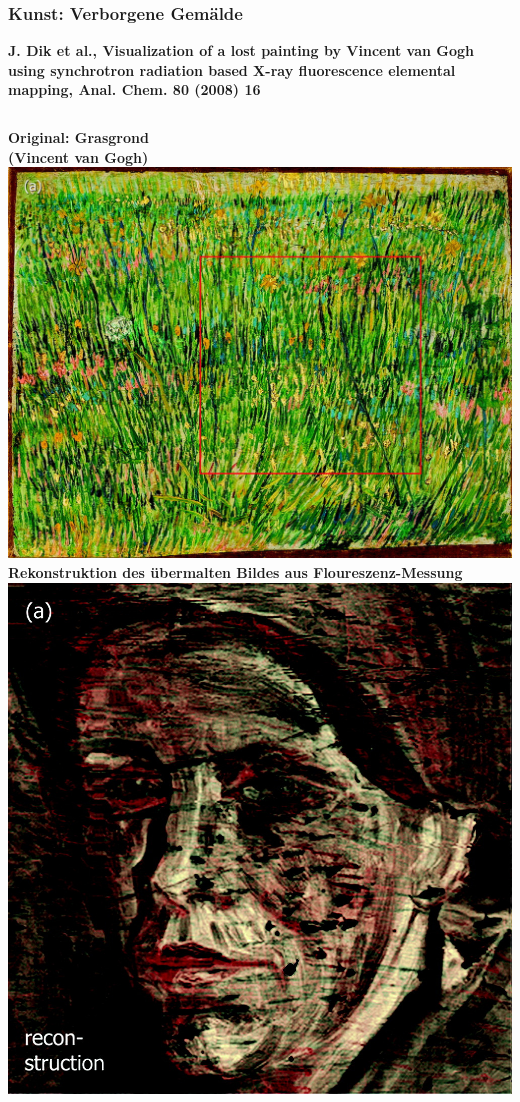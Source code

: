 \documentclass[10pt,t]{beamer}
\begin{document}
\begin{frame}
\frametitle{Kunst: Verborgene Gemälde}
\vspace*{-2.6\baselineskip}
\alert{\bfseries\footnotesize J. Dik et al., Visualization of a lost painting by Vincent van Gogh using synchrotron radiation based X-ray fluorescence elemental mapping, Anal. Chem. 80 (2008) 16 \cite{Dik2008}}
\vspace*{0.5\baselineskip}
\begin{columns}
\textbf{Original: \glqq Grasgrond\grqq\\(Vincent van Gogh)} \\[1ex]
    \includegraphics[width=\textwidth]{vangogh-original}
\textbf{Rekonstruktion des übermalten Bildes aus Floureszenz-Messung} \\[1ex]
    \includegraphics[width=\textwidth]{vangogh-rekonstruktion}
\end{columns}
\vspace*{-8pt}
\end{frame}
\end{document}
